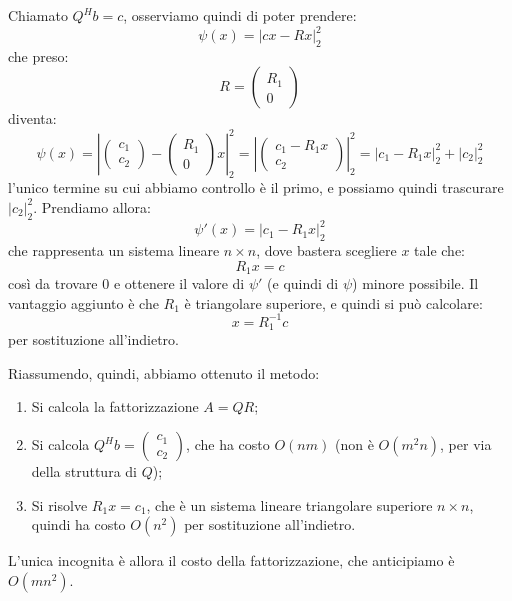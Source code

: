 \documentclass[a4paper,11pt]{article}
\begin{document}
Chiamato $Q^H b = c$, osserviamo quindi di poter prendere:
$$
\psi(x) = |cx - Rx|_2^2
$$
che preso:
	$$
R = \begin{pmatrix}
R_1 \\ 0
\end{pmatrix}
	$$
diventa:
$$
\psi(x) = \left| \begin{pmatrix}
	c_1 \\ c_2
\end{pmatrix} - \begin{pmatrix}
	R_1 \\ 0
\end{pmatrix} x \right|^2_2
=
\left|
\begin{pmatrix}
	c_1 - R_1 x \\ 
	c_2
\end{pmatrix}
\right|_2^2
=
\left|
	c_1 - R_1 x
\right|_2^2
+
|c_2|_2^2
$$
l'unico termine su cui abbiamo controllo è il primo, e possiamo quindi trascurare $|c_2|_2^2$.
Prendiamo allora:
$$
\psi'(x) = |c_1 - R_1 x|_2^2
$$
che rappresenta un sistema lineare $n \times n$, dove bastera scegliere $x$ tale che:
$$
R_1 x = c
$$
così da trovare 0 e ottenere il valore di $\psi'$ (e quindi di $\psi$) minore possibile.
Il vantaggio aggiunto è che $R_1$ è triangolare superiore, e quindi si può calcolare:
$$
x = R_1^{-1} c
$$
per sostituzione all'indietro.

Riassumendo, quindi, abbiamo ottenuto il metodo:
\begin{enumerate}
	\item Si calcola la fattorizzazione $A = QR$;
	\item Si calcola $Q^H b = \begin{pmatrix}
		c_1 \\ c_2
	\end{pmatrix}$, che ha costo $O(nm)$ (non è $O(m^2 n)$, per via della struttura di $Q$);
\item Si risolve $R_1 x = c_1$, che è un sistema lineare triangolare superiore $n \times n$, quindi ha costo $O(n^2)$ per sostituzione all'indietro.
\end{enumerate}

L'unica incognita è allora il costo della fattorizzazione, che anticipiamo è $O(mn^2)$.
\end{document}
